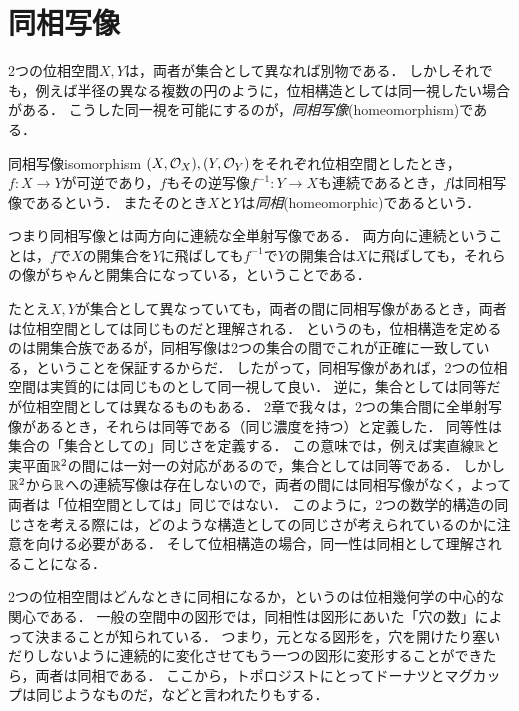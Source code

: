 \documentclass[11pt,a4paper, dvipdfmx]{jsarticle}
\begin{document}

\section{同相写像}
2つの位相空間$X, Y$は，両者が集合として異なれば別物である．
しかしそれでも，例えば半径の異なる複数の円のように，位相構造としては同一視したい場合がある．
こうした同一視を可能にするのが，\emph{同相写像}(homeomorphism)である．


\begin{dfn}{同相写像}{isomorphism}
  $(X, \mathcal{O}_X), (Y, \mathcal{O}_Y)$をそれぞれ位相空間としたとき，$f:X \to Y$が可逆であり，$f$もその逆写像$f^{-1}:Y \to X$も連続であるとき，$f$は同相写像であるという．
  またそのとき$X$と$Y$は\emph{同相}(homeomorphic)であるという．
\end{dfn}

つまり同相写像とは両方向に連続な全単射写像である．
両方向に連続ということは，$f$で$X$の開集合を$Y$に飛ばしても$f^{-1}$で$Y$の開集合は$X$に飛ばしても，それらの像がちゃんと開集合になっている，ということである．

たとえ$X, Y$が集合として異なっていても，両者の間に同相写像があるとき，両者は位相空間としては同じものだと理解される．
というのも，位相構造を定めるのは開集合族であるが，同相写像は2つの集合の間でこれが正確に一致している，ということを保証するからだ．
したがって，同相写像があれば，2つの位相空間は実質的には同じものとして同一視して良い．
逆に，集合としては同等だが位相空間としては異なるものもある．
2章で我々は，2つの集合間に全単射写像があるとき，それらは同等である（同じ濃度を持つ）と定義した．
同等性は集合の「集合としての」同じさを定義する．
この意味では，例えば実直線$\mathbb{R}$と実平面$\mathbb{R}^2$の間には一対一の対応があるので，集合としては同等である．
しかし$\mathbb{R}^2$から$\mathbb{R}$への連続写像は存在しないので，両者の間には同相写像がなく，よって両者は「位相空間としては」同じではない．
このように，2つの数学的構造の同じさを考える際には，どのような構造としての同じさが考えられているのかに注意を向ける必要がある．
そして位相構造の場合，同一性は同相として理解されることになる．


\begin{hatten}{}{}
2つの位相空間はどんなときに同相になるか，というのは位相幾何学の中心的な関心である．
一般の空間中の図形では，同相性は図形にあいた「穴の数」によって決まることが知られている．
つまり，元となる図形を，穴を開けたり塞いだりしないように連続的に変化させてもう一つの図形に変形することができたら，両者は同相である．
ここから，トポロジストにとってドーナツとマグカップは同じようなものだ，などと言われたりもする．
\end{hatten}
\end{document}
